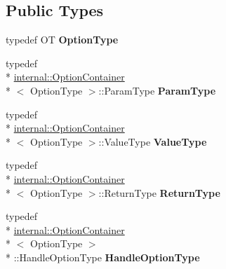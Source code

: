 \subsection*{Public Types}
\begin{DoxyCompactItemize}
\item 
\hypertarget{classcurlpp_1_1Option_ad730f2395a91a44fbad5a1947ae1ddc0}{typedef O\-T {\bfseries Option\-Type}}\label{classcurlpp_1_1Option_ad730f2395a91a44fbad5a1947ae1ddc0}

\item 
\hypertarget{classcurlpp_1_1Option_abff8ae31c85f46ff7124fd164b5dc123}{typedef \\*
\hyperlink{classcurlpp_1_1internal_1_1OptionContainer}{internal\-::\-Option\-Container}\\*
$<$ Option\-Type $>$\-::Param\-Type {\bfseries Param\-Type}}\label{classcurlpp_1_1Option_abff8ae31c85f46ff7124fd164b5dc123}

\item 
\hypertarget{classcurlpp_1_1Option_ac0db1cbc4e5da9e934f406dd9590bfd4}{typedef \\*
\hyperlink{classcurlpp_1_1internal_1_1OptionContainer}{internal\-::\-Option\-Container}\\*
$<$ Option\-Type $>$\-::Value\-Type {\bfseries Value\-Type}}\label{classcurlpp_1_1Option_ac0db1cbc4e5da9e934f406dd9590bfd4}

\item 
\hypertarget{classcurlpp_1_1Option_a71764f6f709450ee0a0632055ef37214}{typedef \\*
\hyperlink{classcurlpp_1_1internal_1_1OptionContainer}{internal\-::\-Option\-Container}\\*
$<$ Option\-Type $>$\-::Return\-Type {\bfseries Return\-Type}}\label{classcurlpp_1_1Option_a71764f6f709450ee0a0632055ef37214}

\item 
\hypertarget{classcurlpp_1_1Option_acf1db22f84698fabbc589008fdb1d95f}{typedef \\*
\hyperlink{classcurlpp_1_1internal_1_1OptionContainer}{internal\-::\-Option\-Container}\\*
$<$ Option\-Type $>$\\*
\-::Handle\-Option\-Type {\bfseries Handle\-Option\-Type}}\label{classcurlpp_1_1Option_acf1db22f84698fabbc589008fdb1d95f}

\end{DoxyCompactItemize}
